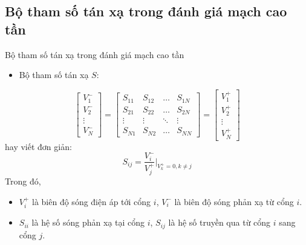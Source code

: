 \subsection{Bộ tham số tán xạ trong đánh giá mạch cao tần}

\begin{frame}{Bộ tham số tán xạ trong đánh giá mạch cao tần}

\begin{itemize}
    \item Bộ tham số tán xạ \(S\):
\end{itemize}
\begin{equation}
    \left[
    \begin{array}{c}
         V_1^- \\
         V_2^- \\
         \vdots \\
         V_N^-
    \end{array}
    \right]
    =
    \left[
    \begin{array}{cccc}
        S_{11} & S_{12} & \ldots & S_{1N} \\
        S_{21} & S_{22} & \ldots & S_{2N} \\
        \vdots & \vdots & \ddots & \vdots \\
        S_{N1} & S_{N2} & \ldots & S_{NN}
    \end{array}\right]
    =
    \left[
    \begin{array}{c}
         V_1^+ \\
         V_2^+ \\
         \vdots \\
         V_N^+
    \end{array}
    \right]
\end{equation}
hay viết đơn giản:
\begin{equation}
    S_{ij} = \dfrac{V_i^-}{V_j^+} |_{V_k^+ = 0, k \neq j}
\end{equation}
Trong đó,
\begin{itemize}
    \item \(V_{i}^+\) là biên độ sóng điện áp tới cổng \(i\), \(V_{i}^-\) là biên độ sóng phản xạ từ cổng \(i\).
    \item \(S_{ii}\) là hệ số sóng phản xạ tại cổng \(i\), \(S_{ij}\) là hệ số truyền qua từ cổng \(i\) sang cổng \(j\).
\end{itemize}
\end{frame}


